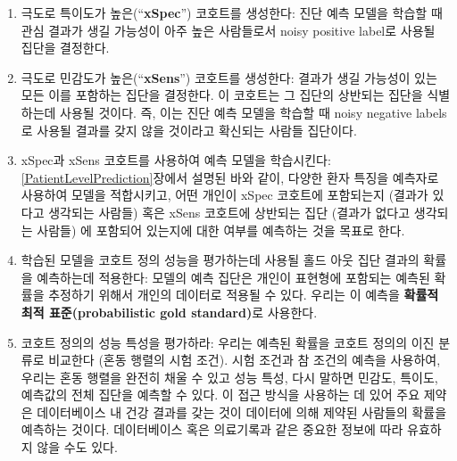 \documentclass[10.5pt]{book}
\providecommand{\tightlist}{%
  \setlength{\itemsep}{0pt}\setlength{\parskip}{0pt}}
\theoremstyle{definition}
\theoremstyle{definition}
\theoremstyle{definition}
\theoremstyle{remark}
\begin{document}
\begin{enumerate}
\def\labelenumi{\arabic{enumi}.}
\tightlist
\item
  극도로 특이도가 높은(``\textbf{xSpec}'') 코호트를 생성한다: 진단 예측
  모델을 학습할 때 관심 결과가 생길 가능성이 아주 높은 사람들로서 noisy
  positive label로 사용될 집단을 결정한다.
\item
  극도로 민감도가 높은(``\textbf{xSens}'') 코호트를 생성한다: 결과가
  생길 가능성이 있는 모든 이를 포함하는 집단을 결정한다. 이 코호트는 그
  집단의 상반되는 집단을 식별하는데 사용될 것이다. 즉, 이는 진단 예측
  모델을 학습할 때 noisy negative labels로 사용될 결과를 갖지 않을
  것이라고 확신되는 사람들 집단이다.
\item
  xSpec과 xSens 코호트를 사용하여 예측 모델을 학습시킨다:
  \ref{PatientLevelPrediction}장에서 설명된 바와 같이, 다양한 환자
  특징을 예측자로 사용하여 모델을 적합시키고, 어떤 개인이 xSpec 코호트에
  포함되는지 (결과가 있다고 생각되는 사람들) 혹은 xSens 코호트에
  상반되는 집단 (결과가 없다고 생각되는 사람들) 에 포함되어 있는지에
  대한 여부를 예측하는 것을 목표로 한다.
\item
  학습된 모델을 코호트 정의 성능을 평가하는데 사용될 홀드 아웃 집단
  결과의 확률을 예측하는데 적용한다: 모델의 예측 집단은 개인이 표현형에
  포함되는 예측된 확률을 추정하기 위해서 개인의 데이터로 적용될 수 있다.
  우리는 이 예측을 \textbf{확률적 최적 표준(probabilistic gold
  standard)}로 사용한다.
\item
  코호트 정의의 성능 특성을 평가하라: 우리는 예측된 확률을 코호트 정의의
  이진 분류로 비교한다 (혼동 행렬의 시험 조건). 시험 조건과 참 조건의
  예측을 사용하여, 우리는 혼동 행렬을 완전히 채울 수 있고 성능 특성,
  다시 말하면 민감도, 특이도, 예측값의 전체 집단을 예측할 수 있다. 이
  접근 방식을 사용하는 데 있어 주요 제약은 데이터베이스 내 건강 결과를
  갖는 것이 데이터에 의해 제약된 사람들의 확률을 예측하는 것이다.
  데이터베이스 혹은 의료기록과 같은 중요한 정보에 따라 유효하지 않을
  수도 있다.
\end{enumerate}
\end{document}
